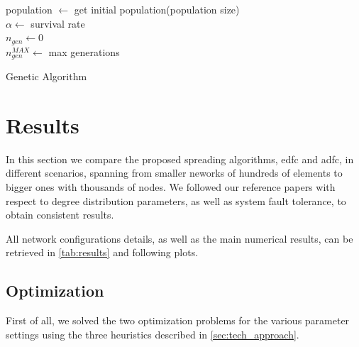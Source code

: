 \documentclass[12pt,journal,draftclsnofoot,onecolumn]{IEEEtran}
\DeclarePairedDelimiter\floor{\lfloor}{\rfloor}
\begin{document}
\begin{algorithm}
	population $\gets$ get initial population(population size) \\
	$\alpha \gets$ survival rate \\
	$n_{gen} \gets 0$ \\
	$n_{gen}^{MAX} \gets$ max generations \\
	\caption{Genetic Algorithm}\label{algo:GA}
\end{algorithm}

\clearpage
\section{Results} \label{sec:results}
In this section we compare the proposed spreading algorithms, \gls{edfc} and \gls{adfc}, in different scenarios, spanning from smaller neworks of hundreds of elements to bigger ones with thousands of nodes.
We followed our reference papers \cite{Lin2007} \cite{Aly2008} with respect to degree distribution parameters, as well as system fault tolerance, to obtain consistent results.

All network configurations details, as well as the main numerical results, can be retrieved in \autoref{tab:results} and following plots.

\subsection{Optimization}
First of all, we solved the two optimization problems for the various parameter settings using the three heuristics described in \autoref{sec:tech_approach}.
\end{document}
